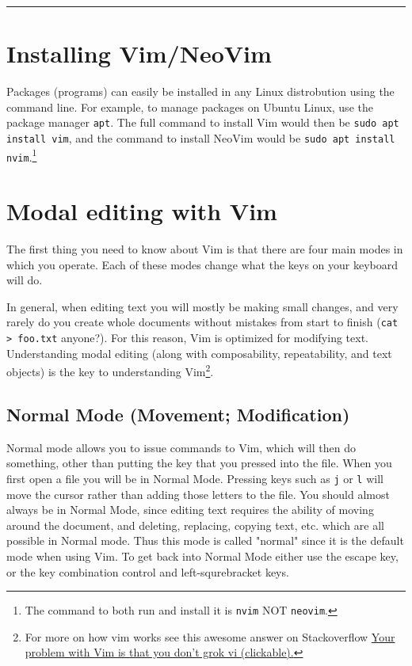 \documentclass[11pt]{article}
\begin{document}
\noindent\rule{\textwidth}{0.5pt}

\newpage

\section{Installing Vim/NeoVim}
\label{sec:orgce4b218}
Packages (programs) can easily be installed in any Linux distrobution using the command line.
For example, to manage packages on Ubuntu Linux, use the package manager \texttt{apt}. The full
command to install Vim would then be \texttt{sudo apt install vim}, and the command to install
NeoVim would be \texttt{sudo apt install nvim}.\footnote{The command to both run and install it is \texttt{nvim} NOT \texttt{neovim}.} 
\section{Modal editing with Vim}
\label{sec:org1c9c959}
The first thing you need to know about Vim is that there are four main modes in
which you operate. Each of these modes change what the keys on your keyboard
will do.

In general, when editing text you will mostly be making small changes, and very
rarely do you create whole documents without mistakes from start to finish (\texttt{cat
> foo.txt} anyone?). For this reason, Vim is optimized for modifying text.
Understanding modal editing (along with composability, repeatability, and text
objects) is the key to understanding Vim\footnote{For more on how vim works see this awesome answer on Stackoverflow
\href{https://stackoverflow.com/questions/1218390/what-is-your-most-productive-shortcut-with-vim}{Your problem with Vim is that you don't grok vi (clickable).}}.
\subsection{Normal Mode (Movement; Modification)}
\label{sec:org3e3d13b}
Normal mode allows you to issue commands to Vim, which will then do something,
other than putting the key that you pressed into the file. When you first open a
file you will be in Normal Mode. Pressing keys such as \texttt{j} or \texttt{l} will move the
cursor rather than adding those letters to the file. You should almost always be
in Normal Mode, since editing text requires the ability of moving around the
document, and deleting, replacing, copying text, etc. which are all possible in
Normal mode. Thus this mode is called "normal" since it is the default mode when
using Vim. To get back into Normal Mode either use the escape key, or the key 
combination control and left-squrebracket keys.
\end{document}
